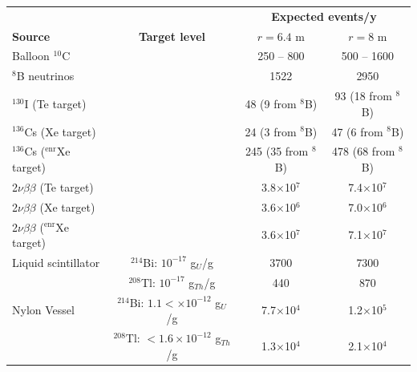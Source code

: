 \begin{table}[t]
\centering
\begin{tabular}{lccc}
\toprule
                                            &                                              & \multicolumn{2}{c}{\bf Expected events/y}     \\
{\bf Source}                                & {\bf Target level}                           & $r = 6.4$ m           & $r = 8$ m             \\
\midrule
Balloon $^{10}$C                            &                                              & 250 -- 800            & 500 -- 1600           \\
$^{8}$B neutrinos                           &                                              & 1522                  & 2950                  \\
$^{130}$I (Te target)                       &                                              & 48 (9 from $^{8}$B)   & 93  (18 from $^{8}$B) \\
$^{136}$Cs (Xe target)                      &                                              & 24 (3 from $^{8}$B)   & 47 (6 from $^{8}$B)   \\
$^{136}$Cs ($^\mathrm{enr}$Xe target)       &                                              & 245 (35 from $^{8}$B) & 478 (68 from $^{8}$B) \\
2$\nu\beta\beta$ (Te target)                &                                              & 3.8$\times$10$^{7}$   & 7.4$\times$10$^{7}$   \\  
2$\nu\beta\beta$ (Xe target)                &                                              & 3.6$\times$10$^{6}$   & 7.0$\times$10$^{6}$   \\  
2$\nu\beta\beta$ ($^\mathrm{enr}$Xe target) &                                              & 3.6$\times$10$^{7}$   &  7.1$\times$10$^{7}$  \\  
Liquid scintillator                         & $^{214}$Bi: $10^{-17}$ g$_{U}$/g             & 3700                  & 7300                  \\
                                            & $^{208}$Tl: $10^{-17}$ g$_{Th}$/g            & 440                   & 870                   \\
Nylon Vessel                                & $^{214}$Bi: $1.1<\times10^{-12}$ g$_{U}$/g   & 7.7$\times$10$^{4}$   & 1.2$\times$10$^{5}$   \\
                                            & $^{208}$Tl: $<1.6\times10^{-12}$ g$_{Th}$/g  & 1.3$\times$10$^{4}$   & 2.1$\times$10$^{4}$   \\

\end{tabular}
\end{table}
